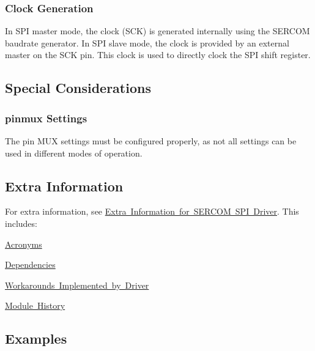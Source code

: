 \hypertarget{group__asfdoc__sam0__sercom__spi__group_asfdoc_sam0_sercom_spi_clock_generation}{}\subsubsection{Clock Generation}\label{group__asfdoc__sam0__sercom__spi__group_asfdoc_sam0_sercom_spi_clock_generation}
In S\+PI master mode, the clock (S\+CK) is generated internally using the S\+E\+R\+C\+OM baudrate generator. In S\+PI slave mode, the clock is provided by an external master on the S\+CK pin. This clock is used to directly clock the S\+PI shift register.\hypertarget{group__asfdoc__sam0__sercom__spi__group_asfdoc_sam0_sercom_spi_special_considerations}{}\subsection{Special Considerations}\label{group__asfdoc__sam0__sercom__spi__group_asfdoc_sam0_sercom_spi_special_considerations}
\hypertarget{group__asfdoc__sam0__sercom__spi__group_pin_mux}{}\subsubsection{pinmux Settings}\label{group__asfdoc__sam0__sercom__spi__group_pin_mux}
The pin M\+UX settings must be configured properly, as not all settings can be used in different modes of operation.\hypertarget{group__asfdoc__sam0__sercom__spi__group_asfdoc_sam0_sercom_spi_extra_info}{}\subsection{Extra Information}\label{group__asfdoc__sam0__sercom__spi__group_asfdoc_sam0_sercom_spi_extra_info}
For extra information, see \mbox{\hyperlink{asfdoc_sam0_sercom_spi_extra}{Extra Information for S\+E\+R\+C\+OM S\+PI Driver}}. This includes\+:
\begin{DoxyItemize}
\item \mbox{\hyperlink{asfdoc_sam0_sercom_spi_extra_asfdoc_sam0_sercom_spi_extra_acronyms}{Acronyms}}
\item \mbox{\hyperlink{asfdoc_sam0_sercom_spi_extra_asfdoc_sam0_sercom_spi_extra_dependencies}{Dependencies}}
\item \mbox{\hyperlink{asfdoc_sam0_sercom_spi_extra_asfdoc_sam0_sercom_spi_extra_workarounds}{Workarounds Implemented by Driver}}
\item \mbox{\hyperlink{asfdoc_sam0_sercom_spi_extra_asfdoc_sam0_sercom_spi_extra_history}{Module History}}
\end{DoxyItemize}\hypertarget{group__asfdoc__sam0__sercom__spi__group_asfdoc_sam0_sercom_spi_examples}{}\subsection{Examples}\label{group__asfdoc__sam0__sercom__spi__group_asfdoc_sam0_sercom_spi_examples}
